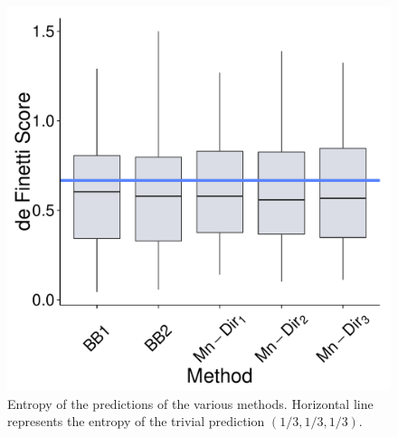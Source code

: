 \documentclass[journal,article,accept,moreauthors,pdftex,12pt,a4paper]{mdpi}
\begin{document}
\begin{figure}[H]
  \centering
\includegraphics[page=10,scale=0.3]{futebolComparacaoModelosForPaper.pdf}
  \caption{Entropy of the predictions of the various methods. Horizontal line represents the entropy of the trivial prediction $(1/3,1/3,1/3)$.}
  \label{fig::entropy}
\end{figure}
\end{document}
